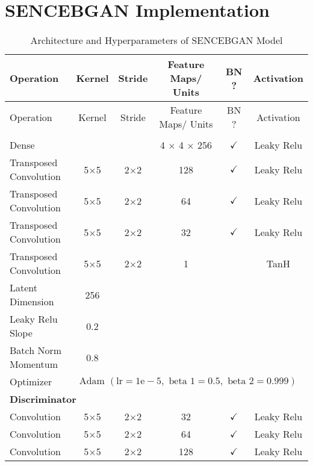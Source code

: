 \section{SENCEBGAN Implementation}
\label{app:sencebgan}
\begin{longtable}[c]{@{}lccccc@{}}
	\caption{Architecture and Hyperparameters of SENCEBGAN Model}
	\label{tab:sencebgan_imp}\\
	\toprule
	Operation & Kernel & Stride & Feature Maps/ Units & BN ? & Activation \\* \midrule
	\endfirsthead
	\toprule
	Operation & Kernel & Stride & Feature Maps/ Units & BN ? & Activation \\* \midrule
	\endhead
	\bottomrule
	\endfoot
	\endlastfoot
		\multicolumn{6}{l}{\textbf{Generator}} \\
	Dense & \multicolumn{1}{c}{} &  & 4 $\times$ 4 $\times$ 256 & $\checkmark$ & Leaky Relu \\
	Transposed Convolution & \multicolumn{1}{c}{5$\times$5} & 2$\times$2 & 128 & $\checkmark$ & Leaky Relu \\
	Transposed Convolution & \multicolumn{1}{c}{5$\times$5} & 2$\times$2 & 64 & $\checkmark$ & Leaky Relu \\
	Transposed Convolution & \multicolumn{1}{c}{5$\times$5} & 2$\times$2 & 32 & $\checkmark$ & Leaky Relu \\
	Transposed Convolution & \multicolumn{1}{c}{5$\times$5} & 2$\times$2 & 1 &  & TanH\\ \hline
	Latent Dimension & 256 & \multicolumn{1}{l}{} & \multicolumn{1}{l}{} & \multicolumn{1}{l}{} & \multicolumn{1}{l}{} \\
	Leaky Relu Slope & 0.2 & \multicolumn{1}{l}{} & \multicolumn{1}{l}{} & \multicolumn{1}{l}{} & \multicolumn{1}{l}{} \\
	Batch Norm Momentum & 0.8 & \multicolumn{1}{l}{} & \multicolumn{1}{l}{} & \multicolumn{1}{l}{} & \multicolumn{1}{l}{} \\
	Optimizer & \multicolumn{5}{l}{$\text { Adam }(\mathrm{lr}=1 \mathrm{e}-5, \text { beta } 1=0.5, \text { beta } 2=0.999)$} \\ \hline
	\multicolumn{6}{l}{\textbf{Discriminator}} \\
	Convolution & \multicolumn{1}{c}{5$\times$5} & 2$\times$2 & 32 & $\checkmark$ & Leaky Relu \\
	Convolution & \multicolumn{1}{c}{5$\times$5} & 2$\times$2 & 64 & $\checkmark$ & Leaky Relu \\
	Convolution & \multicolumn{1}{c}{5$\times$5} & 2$\times$2 & 128 & $\checkmark$ & Leaky Relu \\

\end{longtable}
